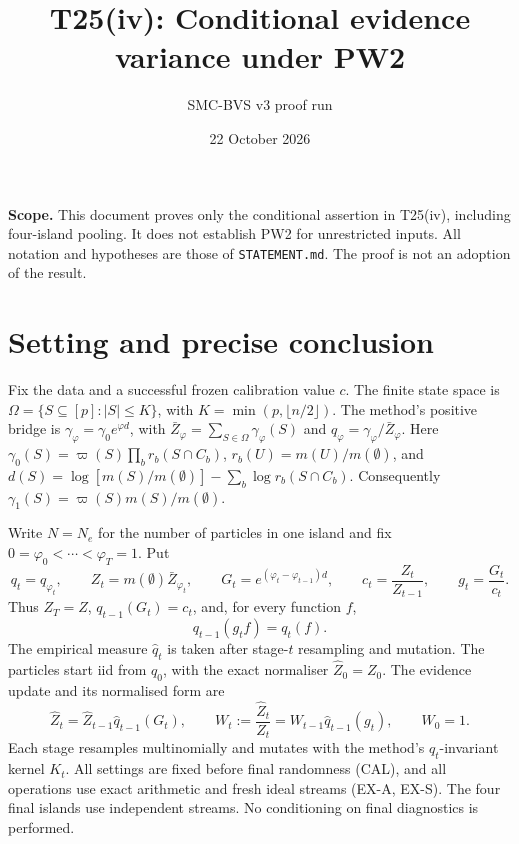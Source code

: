 \documentclass[11pt]{article}
\title{T25(iv): Conditional evidence variance under PW2}
\author{SMC-BVS v3 proof run}
\date{22 October 2026}
\newcommand{\qh}{\widehat q}
\newcommand{\Zh}{\widehat Z}
\begin{document}
\maketitle
\noindent\textbf{Scope.} This document proves only the conditional assertion
in T25(iv), including four-island pooling. It does not establish PW2 for
unrestricted inputs. All notation and hypotheses are those of
\texttt{STATEMENT.md}. The proof is not an adoption of the result.

\section{Setting and precise conclusion}
Fix the data and a successful frozen calibration value $c$. The finite
state space is $\Omega=\{S\subseteq[p]:|S|\le K\}$, with
$K=\min(p,\lfloor n/2\rfloor)$. The method's positive bridge is
$\gamma_\varphi=\gamma_0 e^{\varphi d}$, with
$\bar Z_\varphi=\sum_{S\in\Omega}\gamma_\varphi(S)$ and
$q_\varphi=\gamma_\varphi/\bar Z_\varphi$.
Here $\gamma_0(S)=\varpi(S)\prod_b r_b(S\cap C_b)$,
$r_b(U)=m(U)/m(\emptyset)$, and
$d(S)=\log[m(S)/m(\emptyset)]-\sum_b\log r_b(S\cap C_b)$.
Consequently $\gamma_1(S)=\varpi(S)m(S)/m(\emptyset)$.

Write $N=N_e$ for the number of particles in one island and fix
$0=\varphi_0<\cdots<\varphi_T=1$. Put
\[
 q_t=q_{\varphi_t},\qquad Z_t=m(\emptyset)\bar Z_{\varphi_t},\qquad
 G_t=e^{(\varphi_t-\varphi_{t-1})d},\qquad
 c_t=\frac{Z_t}{Z_{t-1}},\qquad g_t=\frac{G_t}{c_t}.
\]
Thus $Z_T=Z$, $q_{t-1}(G_t)=c_t$, and, for every function $f$,
\begin{equation}\label{eq:bridge}
 q_{t-1}(g_t f)=q_t(f).
\end{equation}
The empirical measure $\qh_t$ is taken after stage-$t$ resampling and
mutation. The particles start iid from $q_0$, with the exact normaliser
$\Zh_0=Z_0$. The evidence update and its normalised form are
\begin{equation}\label{eq:path}
 \Zh_t=\Zh_{t-1}\qh_{t-1}(G_t),\qquad
 W_t:=\frac{\Zh_t}{Z_t}
       =W_{t-1}\qh_{t-1}(g_t),\qquad W_0=1.
\end{equation}
Each stage resamples multinomially and mutates with the method's
$q_t$-invariant kernel $K_t$. All settings are fixed before final
randomness (CAL), and all operations use exact arithmetic and fresh ideal
streams (EX-A, EX-S). The four final islands use independent streams.
No conditioning on final diagnostics is performed.
\end{document}
